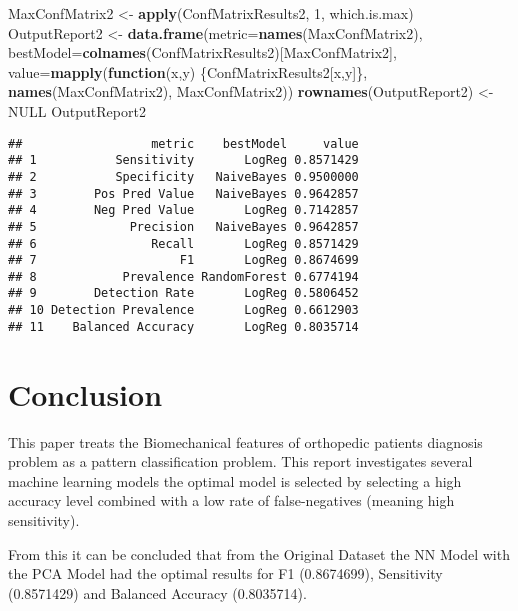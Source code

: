 \documentclass[
]{article}
\newenvironment{Shaded}{\begin{snugshade}}{\end{snugshade}}
\newcommand{\ControlFlowTok}[1]{\textcolor[rgb]{0.13,0.29,0.53}{\textbf{#1}}}
\newcommand{\DataTypeTok}[1]{\textcolor[rgb]{0.13,0.29,0.53}{#1}}
\newcommand{\DecValTok}[1]{\textcolor[rgb]{0.00,0.00,0.81}{#1}}
\newcommand{\KeywordTok}[1]{\textcolor[rgb]{0.13,0.29,0.53}{\textbf{#1}}}
\newcommand{\NormalTok}[1]{#1}
\newcommand{\OtherTok}[1]{\textcolor[rgb]{0.56,0.35,0.01}{#1}}
\newcommand{\StringTok}[1]{\textcolor[rgb]{0.31,0.60,0.02}{#1}}
\begin{document}
\begin{Shaded}
\begin{Highlighting}[]
\NormalTok{MaxConfMatrix2 <-}\StringTok{ }\KeywordTok{apply}\NormalTok{(ConfMatrixResults2, }\DecValTok{1}\NormalTok{, which.is.max)}
\NormalTok{OutputReport2 <-}\StringTok{ }\KeywordTok{data.frame}\NormalTok{(}\DataTypeTok{metric=}\KeywordTok{names}\NormalTok{(MaxConfMatrix2), }
                            \DataTypeTok{bestModel=}\KeywordTok{colnames}\NormalTok{(ConfMatrixResults2)[MaxConfMatrix2],}
                            \DataTypeTok{value=}\KeywordTok{mapply}\NormalTok{(}\ControlFlowTok{function}\NormalTok{(x,y) \{ConfMatrixResults2[x,y]\}, }
                                         \KeywordTok{names}\NormalTok{(MaxConfMatrix2), }
\NormalTok{                                         MaxConfMatrix2))}
\KeywordTok{rownames}\NormalTok{(OutputReport2) <-}\StringTok{ }\OtherTok{NULL}
\NormalTok{OutputReport2}
\end{Highlighting}
\end{Shaded}

\begin{verbatim}
##                  metric    bestModel     value
## 1           Sensitivity       LogReg 0.8571429
## 2           Specificity   NaiveBayes 0.9500000
## 3        Pos Pred Value   NaiveBayes 0.9642857
## 4        Neg Pred Value       LogReg 0.7142857
## 5             Precision   NaiveBayes 0.9642857
## 6                Recall       LogReg 0.8571429
## 7                    F1       LogReg 0.8674699
## 8            Prevalence RandomForest 0.6774194
## 9        Detection Rate       LogReg 0.5806452
## 10 Detection Prevalence       LogReg 0.6612903
## 11    Balanced Accuracy       LogReg 0.8035714
\end{verbatim}

\newpage

\hypertarget{conclusion}{%
\section{Conclusion}\label{conclusion}}

This paper treats the Biomechanical features of orthopedic patients
diagnosis problem as a pattern classification problem. This report
investigates several machine learning models the optimal model is
selected by selecting a high accuracy level combined with a low rate of
false-negatives (meaning high sensitivity).

From this it can be concluded that from the Original Dataset the NN
Model with the PCA Model had the optimal results for F1 (0.8674699),
Sensitivity (0.8571429) and Balanced Accuracy (0.8035714).
\end{document}
